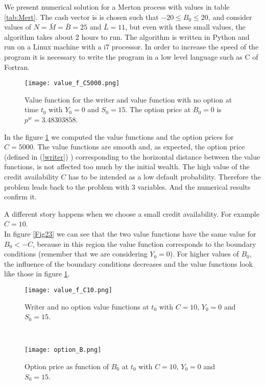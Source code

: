 We present numerical solution for a Merton process with values in table \ref{tab:Mert}. 
The cash vector is is chosen such that $-20 \leq B_0 \leq 20$, and consider values of $N = \bar M = \bar B = 25$ and $\bar L = 11$, 
but even with these small values, the algorithm takes about 2 hours to run. 
The algorithm is written in Python and run on a Linux machine with a i7 processor. In order to increase the speed of the program
it is necessary to write the program in a low level language such as C of Fortran.
\begin{figure}[t!]
   \centering
   \texttt{[image: value\_f\_C5000.png]}
   \caption{Value function for the writer and value function with no option at time $t_0$ with $Y_0=0$ and $S_0=15$. The option price at $B_0=0$ is $p^w=3.48303858$.}
   \label{Fig22} 
\end{figure}

In the figure \ref{Fig22} we computed the value functions and the option prices for $C= 5000$.
The value functions are smooth and, as expected, the option price (defined in (\ref{writer}) ) corresponding to the horizontal distance between the value functions,
is not affected too much by the initial wealth. 
The high value of the credit availability $C$ 
has to be intended as a low default probability. Therefore the problem leads back to the problem with 3 variables. And the numerical results confirm it.

A different story happens when we choose a small credit availability. For example $C = 10$.\\ 
In figure \ref{Fig23} we can see that the two value functions have the same value for $B_0 < -C$, because in this region the value function corresponds to the boundary conditions
(remember that we are considering $Y_0=0$). 
For higher values of $B_0$, the influence of the boundary conditions decreases and the value functions look like those in figure \ref{Fig22}.
\begin{figure}[t!]
 \begin{minipage}[b]{0.5\linewidth}
   \centering
   \texttt{[image: value\_f\_C10.png]}
   \caption{Writer and no option value functions at $t_0$ with $C=10$, $Y_0=0$ and $S_0=15$.}
   \label{Fig23} 
 \end{minipage}
 \ \hspace{2mm} \hspace{3mm} \
 \begin{minipage}[b]{0.5\linewidth}
   \texttt{[image: option\_B.png]}
   \caption{Option price as function of $B_0$ at $t_0$ with $C=10$, $Y_0=0$ and $S_0=15$.}
   \label{Fig24}
 \end{minipage}
\end{figure}  

